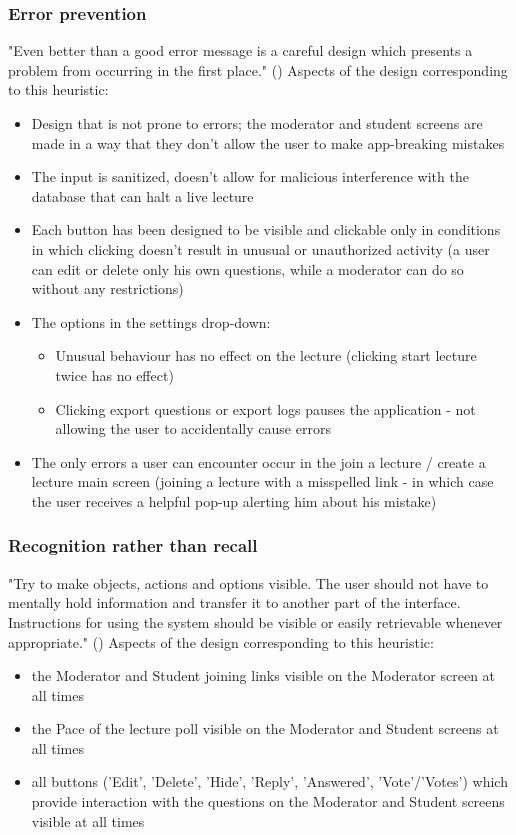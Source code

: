 \documentclass{article}
\begin{document}
\subsubsection{Error prevention\label{5thheuristic}}
"Even better than a good error message is a careful design which presents a problem from occurring in the first place." (\textcite{Nielsen1994})
Aspects of the design corresponding to this heuristic:
\begin{itemize}
    \item Design that is not prone to errors; the moderator and student screens are made in a way that they don't allow the user to make app-breaking mistakes
    \item The input is sanitized, doesn't allow for malicious interference with the database that can halt a live lecture
    \item Each button has been designed to be visible and clickable only in conditions in which clicking doesn't result in unusual or unauthorized activity (a user can edit or delete only his own questions, while a moderator can do so without any restrictions)
    \item The options in the settings drop-down:
        \begin{itemize}
            \item Unusual behaviour has no effect on the lecture (clicking start lecture twice has no effect)
            \item Clicking export questions or export logs pauses the application - not allowing the user to accidentally cause errors
        \end{itemize}
    \item The only errors a user can encounter occur in the join a lecture / create a lecture main screen (joining a lecture with a misspelled link - in which case the user receives a helpful pop-up alerting him about his mistake)
\end{itemize}
\subsubsection{Recognition rather than recall\label{6thheuristic}}
"Try to make objects, actions and options visible. The user should not have to mentally hold information and transfer it to another part of the interface. Instructions for using the system should be visible or easily retrievable whenever appropriate." (\textcite{Nielsen1994})
Aspects of the design corresponding to this heuristic:
\begin{itemize}
\item the Moderator and Student joining links visible on the Moderator screen at all times
\item the Pace of the lecture poll visible on the Moderator and Student screens at all times
\item all buttons ('Edit', 'Delete', 'Hide', 'Reply', 'Answered', 'Vote'/'Votes') which provide interaction with the questions on the Moderator and Student screens visible at all times
\end{itemize}
\end{document}
